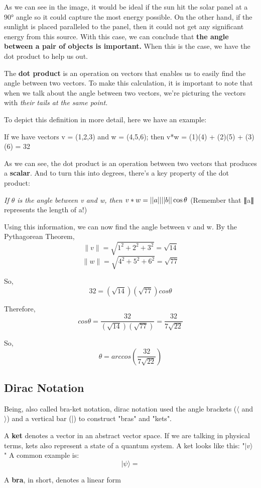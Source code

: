 As we can see in the image, it would be ideal if the sun hit the solar panel at a 90° angle so it could capture the most energy possible. On the other hand, if the sunlight is placed paralleled to the panel, then it could not get any significant energy from this source. With this case, we can conclude that \textbf{the angle between a pair of objects is important.}
 When this is the case, we have the dot product to help us out.
 
 The \textbf{dot product} is an operation on vectors that enables us to easily find the angle between two vectors. To make this calculation, it is important to note that when we talk about the angle between two vectors, we're picturing the vectors with \textit{their tails at the same point.}
 
To depict this definition in more detail, here we have an example:

If we have vectors v = (1,2,3) and w = (4,5,6); then v*w = (1)(4) + (2)(5) + (3)(6) = 32

As we can see, the dot product is an operation between two vectors that produces a \textbf{scalar}. And to turn this into degrees, there's a key property of the dot product:

\textit{If $\theta$ is the angle between v and w, then $v*w = |\abs{a}||\abs{b}| \cos\theta$} (Remember that ∥a∥ represents the length of a!)
 
Using this information, we can now find the angle between v and w. By the Pythagorean Theorem,
\[∥v∥ = \sqrt{1^2 + 2^2 + 3^2} = \sqrt{14}\]
\[∥w∥ = \sqrt{4^2 + 5^2 + 6^2} = \sqrt{77}\]

So, 
\[32 = (\sqrt{14})(\sqrt{77})cos \theta\]

Therefore,
\[cos \theta = \frac{32}{(\sqrt{14})(\sqrt{77})} = \frac{32}{7\sqrt{22}}\]

So,
\[\theta = arccos(\frac{32}{7\sqrt{22}})\]

\subsection{Dirac Notation}
Being, also called bra-ket notation, dirac notation used the angle brackets ($\langle$ and $\rangle$) and a vertical bar (|) to construct "bras" and "kets".

A \textbf{ket} denotes a vector in an abstract vector space. If we are talking in physical terms, kets also represent a state of a quantum system. A ket looks like this: "{$\displaystyle |v\rangle$ }" A common example is:
\[|\psi \rangle = \]

A \textbf{bra}, in short, denotes a linear form 
